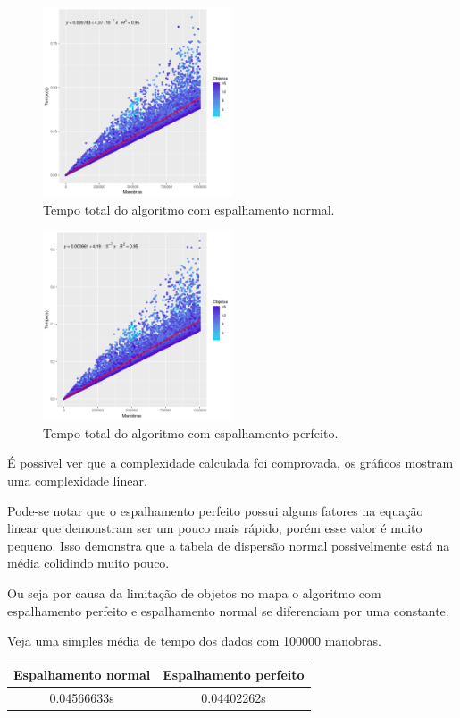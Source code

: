 \documentclass[11pt]{article}
\begin{document}
\begin{figure}[htbp]
\centering
\includegraphics[width=0.5\textwidth]{normal-data-gg.png}
\caption{Tempo total do algoritmo com espalhamento normal.\label{fig:normal-data-total}}
\end{figure}

\begin{figure}[htbp]
\centering
\includegraphics[width=0.5\textwidth]{perfect-data-gg.png}
\caption{Tempo total do algoritmo com espalhamento perfeito.\label{fig:perfect-data-total}}
\end{figure}

É possível ver que a complexidade calculada foi comprovada, os gráficos mostram uma complexidade linear.

Pode-se notar que o espalhamento perfeito possui alguns fatores na equação linear que demonstram ser um pouco mais rápido, porém esse valor é muito pequeno. Isso demonstra que a tabela de dispersão normal possivelmente está na média colidindo muito pouco.

Ou seja por causa da limitação de objetos no mapa o algoritmo com espalhamento perfeito e espalhamento normal se diferenciam por uma constante.

\bigskip
Veja uma simples média de tempo dos dados com 100000 manobras.
\begin{center}
\begin{tabular}{|c|c|}
\hline
Espalhamento normal & Espalhamento perfeito\\
\hline
0.04566633s & 0.04402262s\\
\hline
\end{tabular}

\end{center}
\end{document}
